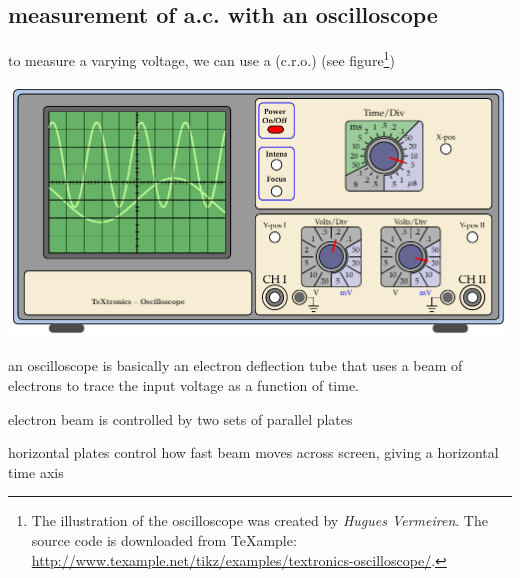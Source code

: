 \newpage




\subsection{measurement of a.c. with an oscilloscope}

to measure a varying voltage, we can use a  (c.r.o.)  (see figure\footnote{The illustration of the oscilloscope was created by \emph{Hugues Vermeiren}. The source code is downloaded from TeXample: \url{http://www.texample.net/tikz/examples/textronics-oscilloscope/}.  })

\begin{center}
\includegraphics[height=190pt]{oscilloscope.pdf}
\end{center}

an oscilloscope is basically an electron deflection tube that uses a beam of electrons to trace the input voltage as a function of time.

electron beam is controlled by two sets of parallel plates

horizontal plates control how fast beam moves across screen, giving a horizontal time axis

